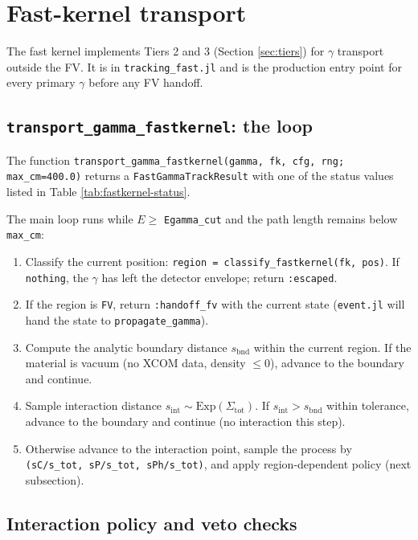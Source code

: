 \documentclass[11pt]{article}
\begin{document}
\section{Fast-kernel transport}
\label{sec:fastkernel}

The fast kernel implements Tiers 2 and 3 (Section \ref{sec:tiers}) for
$\gamma$ transport outside the FV. It is in \texttt{tracking\_fast.jl} and
is the production entry point for every primary $\gamma$ before any FV
handoff.

\subsection{\texttt{transport\_gamma\_fastkernel}: the loop}
\label{sec:fastkernel-loop}

The function \texttt{transport\_gamma\_fastkernel(gamma, fk, cfg, rng;
max\_cm=400.0)} returns a \texttt{FastGammaTrackResult} with one of the
status values listed in Table \ref{tab:fastkernel-status}.

The main loop runs while $E \geq $ \texttt{Egamma\_cut} and the path length
remains below \texttt{max\_cm}:

\begin{enumerate}[label=\arabic*.]
\item Classify the current position: \texttt{region =
classify\_fastkernel(fk, pos)}. If \texttt{nothing}, the $\gamma$ has left the
detector envelope; return \texttt{:escaped}.
\item If the region is \texttt{FV}, return \texttt{:handoff\_fv} with the
current state (\texttt{event.jl} will hand the state to
\texttt{propagate\_gamma}).
\item Compute the analytic boundary distance $s_{\mathrm{bnd}}$ within the
current region. If the material is vacuum (no XCOM data, density $\leq 0$),
advance to the boundary and continue.
\item Sample interaction distance
$s_{\mathrm{int}} \sim \mathrm{Exp}(\Sigma_{\mathrm{tot}})$. If
$s_{\mathrm{int}} > s_{\mathrm{bnd}}$ within tolerance, advance to the
boundary and continue (no interaction this step).
\item Otherwise advance to the interaction point, sample the process by
\texttt{(sC/s\_tot, sP/s\_tot, sPh/s\_tot)}, and apply region-dependent
policy (next subsection).
\end{enumerate}

\subsection{Interaction policy and veto checks}
\label{sec:fastkernel-policy}
\end{document}
